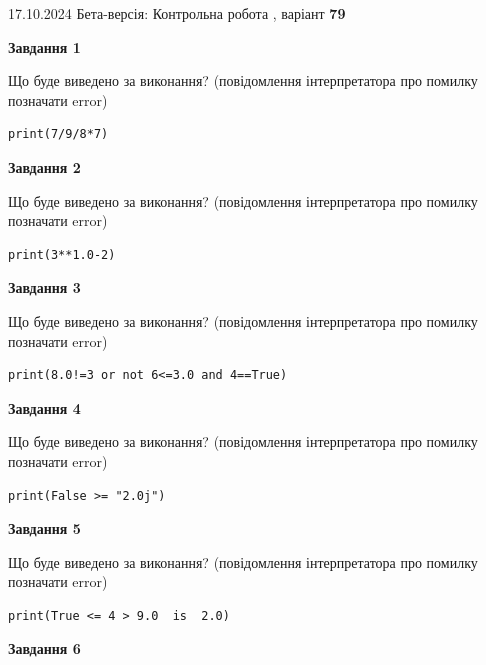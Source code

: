 \documentclass[12pt, ukrainian]{article}
\begin{document}
{\Large{17.10.2024 Бета-версія: Контрольна робота , варіант  \No \textbf { 79 }\par}}
{
\begin {large}
{\begin {center}\textbf{Завдання 1}\end {center}}

Що буде виведено за виконання? (повідомлення інтерпретатора про помилку позначати error)\par
\begin{verbatim}
print(7/9/8*7)
\end{verbatim}

{\begin {center}\textbf{Завдання 2}\end {center}}

Що буде виведено за виконання? (повідомлення інтерпретатора про помилку позначати error)\par
\begin{verbatim}
print(3**1.0-2)
\end{verbatim}

{\begin {center}\textbf{Завдання 3}\end {center}}

Що буде виведено за виконання? (повідомлення інтерпретатора про помилку позначати error)\par
\begin{verbatim}
print(8.0!=3 or not 6<=3.0 and 4==True)
\end{verbatim}

{\begin {center}\textbf{Завдання 4}\end {center}}

Що буде виведено за виконання? (повідомлення інтерпретатора про помилку позначати error)\par
\begin{verbatim}
print(False >= "2.0j")
\end{verbatim}

{\begin {center}\textbf{Завдання 5}\end {center}}

Що буде виведено за виконання? (повідомлення інтерпретатора про помилку позначати error)\par
\begin{verbatim}
print(True <= 4 > 9.0  is  2.0)
\end{verbatim}

{\begin {center}\textbf{Завдання 6}\end {center}}


\end{large}}
\end{document}
